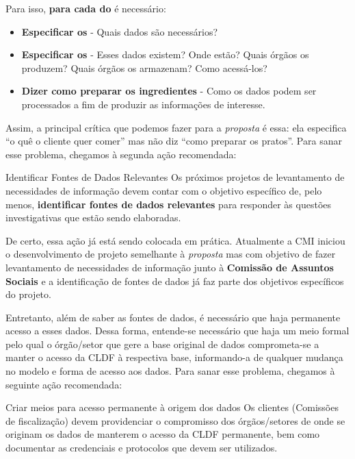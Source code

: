     Para isso, \textbf{para cada \PRATO \xspace do \CARDAPIO} \xspace é necessário:
    
    \begin{itemize}
        \item \textbf{Especificar os \INGREDIENTES} - Quais dados são necessários? 
        \item \textbf{Especificar os \PRODUTORES} - Esses dados existem? Onde estão? Quais órgãos os produzem? Quais órgãos os armazenam? Como acessá-los?
        \item \textbf{Dizer como preparar os ingredientes} - Como os dados podem ser processados a fim de produzir as informações de interesse.
    \end{itemize}
    
    Assim, a principal crítica que podemos fazer para a \emph{proposta} é essa: ela especifica ``o quê o cliente quer comer'' mas não diz ``como preparar os pratos''. Para sanar esse problema, chegamos à segunda ação recomendada:
    
    \begin{env-proposta}{Identificar Fontes de Dados Relevantes}
        \nohyphens{Os próximos projetos de levantamento de necessidades de informação devem contar com o objetivo específico de, pelo menos, \textbf{identificar fontes de dados relevantes} para responder às questões investigativas que estão sendo elaboradas.}
    \end{env-proposta}

    De certo, essa ação já está sendo colocada em prática. Atualmente a CMI iniciou o desenvolvimento de projeto semelhante à \emph{proposta} mas com objetivo de fazer levantamento de necessidades de informação junto à \textbf{Comissão de Assuntos Sociais}  \cite{propostaCAS} e a identificação de fontes de dados já faz parte dos objetivos específicos do projeto. 

    Entretanto, além de saber as fontes de dados, é necessário que haja permanente acesso a esses dados. Dessa forma, entende-se necessário que haja um meio formal pelo qual o órgão/setor que gere a base original de dados comprometa-se a manter o acesso da CLDF à respectiva base, informando-a de qualquer mudança no modelo e forma de acesso aos dados. Para sanar esse problema, chegamos à seguinte ação recomendada:
    
    \begin{env-proposta}{Criar meios para acesso permanente à origem dos dados}
        \nohyphens{Os clientes (Comissões de fiscalização) devem providenciar o compromisso dos órgãos/setores de onde se originam os dados de manterem o acesso da CLDF permanente, bem como documentar as credenciais e protocolos que devem ser utilizados.}
    \end{env-proposta}
    
